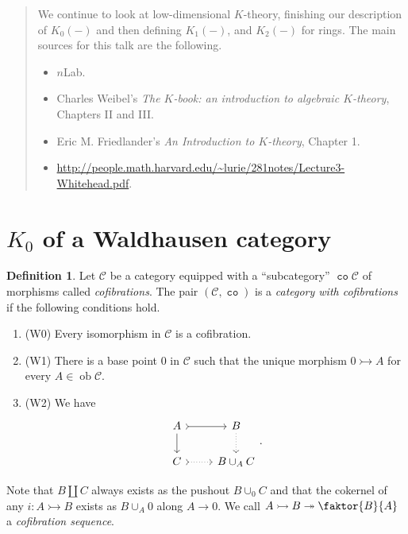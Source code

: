 \documentclass[10pt,letterpaper,cm]{nupset}
\theoremstyle{definition}
\newtheorem{definition}{Definition}[section]
\theoremstyle{theorem}
\theoremstyle{remark}
\newcommand{\1}{\mathbf{1}}
\renewcommand{\c}{\mathscr{C}}
\newcommand{\0}{\vec 0}
\DeclareMathOperator{\ob}{ob}
\DeclareMathOperator{\co}{\mathtt{co}}
\begin{document}
\begin{abstract}
We continue to look at low-dimensional $K$-theory, finishing our description of $K_0(-)$ and then defining $K_1(-)$, and $K_2(-)$ for rings. The main sources for this talk are the following.
\begin{itemize}
\item $n$Lab.
\item Charles Weibel's \textit{The $K$-book: an introduction to algebraic $K$-theory}, Chapters II and III.
\item Eric M. Friedlander's \textit{An Introduction to $K$-theory}, Chapter 1.
\item \url{http://people.math.harvard.edu/~lurie/281notes/Lecture3-Whitehead.pdf}.
\end{itemize}
\end{abstract}

\smallskip

\section{$K_0$ of a Waldhausen category}

\begin{definition}
Let $\c$ be a category equipped with a ``subcategory'' $\co{\c}$ of morphisms called \textit{cofibrations}. The pair $\left(\c, \co\right)$ is a \textit{category with cofibrations} if the following conditions hold.
\begin{enumerate}
\item (W0) Every isomorphism in $\c$ is a cofibration.
\item (W1) There is a base point $0$ in $\c$ such that the unique morphism $0 \rightarrowtail A$ for every $A \in \ob \c$.
\item (W2) We have
\[
\begin{tikzcd}
A \arrow[d] \arrow[r, tail] & B \arrow[d, dotted] \\
C \arrow[r, dotted, tail] & B \cup_A C
\end{tikzcd}.
\]
\end{enumerate}
\end{definition}


Note that $B \coprod C$ always exists as the pushout $B \cup_0 C$ and that the cokernel of any $i : A \rightarrowtail B$ exists as $B \cup_A 0$ along $A \to 0$. We call $A \rightarrowtail  B \twoheadrightarrow \faktor{B}{A}$ a \textit{cofibration sequence}.
\end{document}
